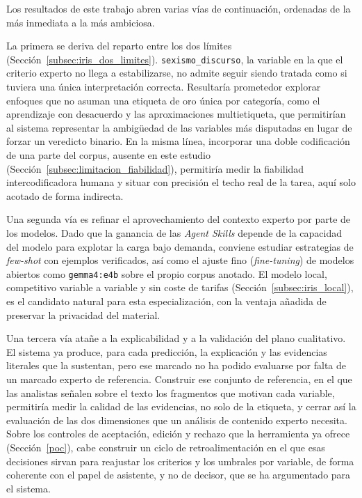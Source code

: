 
Los resultados de este trabajo abren varias vías de continuación, ordenadas de la más
inmediata a la más ambiciosa.

La primera se deriva del reparto entre los dos límites
(Sección~\ref{subsec:iris_dos_limites}). \texttt{sexismo\_discurso}, la variable en la
que el criterio experto no llega a estabilizarse, no admite seguir siendo tratada como
si tuviera una única interpretación correcta. Resultaría prometedor explorar
enfoques que no asuman una etiqueta de oro única por categoría, como el aprendizaje con
desacuerdo y las aproximaciones multietiqueta, que permitirían al sistema representar la
ambigüedad de las variables más disputadas en lugar de forzar un veredicto binario. En
la misma línea, incorporar una doble codificación de una parte del corpus, ausente en
este estudio (Sección~\ref{subsec:limitacion_fiabilidad}), permitiría medir la
fiabilidad intercodificadora humana y situar con precisión el techo real de la tarea,
aquí solo acotado de forma indirecta.

Una segunda vía es refinar el aprovechamiento del contexto experto por parte de los
modelos. Dado que la ganancia de las \textit{Agent Skills} depende de la capacidad del
modelo para explotar la carga bajo demanda, conviene estudiar estrategias de
\textit{few-shot} con ejemplos verificados, así como el ajuste fino (\textit{fine-tuning})
de modelos abiertos como \texttt{gemma4:e4b} sobre el propio corpus anotado. El modelo
local, competitivo variable a variable y sin coste de tarifas
(Sección~\ref{subsec:iris_local}), es el candidato natural para esta especialización,
con la ventaja añadida de preservar la privacidad del material.

Una tercera vía atañe a la explicabilidad y a la validación del plano cualitativo. El
sistema ya produce, para cada predicción, la explicación y las evidencias literales que
la sustentan, pero ese marcado no ha podido evaluarse por falta de un marcado experto de
referencia. Construir ese conjunto de referencia, en el que las analistas señalen sobre
el texto los fragmentos que motivan cada variable, permitiría medir la calidad de las
evidencias, no solo de la etiqueta, y cerrar así la evaluación de las dos dimensiones que
un análisis de contenido experto necesita. Sobre los controles de aceptación, edición y
rechazo que la herramienta ya ofrece (Sección~\ref{poc}), cabe construir un ciclo de
retroalimentación en el que esas decisiones sirvan para reajustar los criterios y los
umbrales por variable, de forma coherente con el papel de asistente, y no de decisor,
que se ha argumentado para el sistema.

